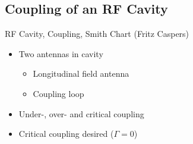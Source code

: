 \documentclass{beamer}
\begin{document}
\subsection{Coupling of an RF Cavity}
\begin{frame}[t,fragile]{RF Cavity, Coupling, Smith Chart (Fritz Caspers)}
\begin{itemize}
\item  Two antennas in cavity
\begin{itemize}
\item Longitudinal field antenna
\item Coupling loop
\end{itemize}
\item Under-, over- and critical coupling

\begin{figure}
  \centering\setcounter{subfigure}{0}
  \;
  \;
\end{figure}
\item Critical coupling desired ($\Gamma=0$)
\end{itemize}
\end{frame}
\end{document}
